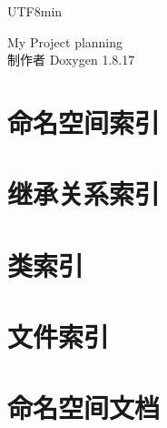 \let\mypdfximage\pdfximage\def\pdfximage{\immediate\mypdfximage}\documentclass[twoside]{book}
\newcommand{\+}{\discretionary{\mbox{\scriptsize$\hookleftarrow$}}{}{}}
\newcommand{\clearemptydoublepage}{%
  \newpage{\pagestyle{empty}\cleardoublepage}%
}
\begin{document}
\begin{CJK}{UTF8}{min}

\hypersetup{pageanchor=false,
             bookmarksnumbered=true,
             pdfencoding=unicode
            }
\begin{titlepage}
\vspace*{7cm}
\begin{center}%
{\Large My Project planning }\\
\vspace*{1cm}
{\large 制作者 Doxygen 1.8.17}\\
\end{center}
\end{titlepage}
\clearemptydoublepage
{}
\tableofcontents
\clearemptydoublepage
{}
\hypersetup{pageanchor=true}

\chapter{命名空间索引}

\chapter{继承关系索引}

\chapter{类索引}

\chapter{文件索引}

\chapter{命名空间文档}





\end{CJK}
\end{document}
